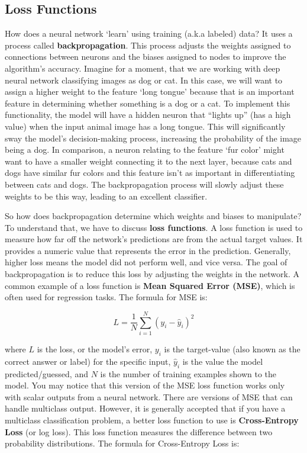 \subsection{Loss Functions}
\begin{flushleft}
    \large How does a neural network `learn' using training (a.k.a labeled) data? It uses a process called \textbf{backpropagation}. This process adjusts the weights assigned to connections between neurons and the biases assigned to nodes to improve the algorithm's accuracy. Imagine for a moment, that we are working with deep neural network classifying images as dog or cat. In this case, we will want to assign a higher weight to the feature `long tongue' because that is an important feature in determining whether something is a dog or a cat. To implement this functionality, the model will have a hidden neuron that ``lights up'' (has a high value) when the input animal image has a long tongue. This will significantly sway the model's decision-making process, increasing the probability of the image being a dog. In comparison, a neuron relating to the feature `fur color' might want to have a smaller weight connecting it to the next layer, because cats and dogs have similar fur colors and this feature isn't as important in differentiating between cats and dogs. The backpropagation process will slowly adjust these weights to be this way, leading to an excellent classifier. \break
    
    So how does backpropagation determine which weights and biases to manipulate? To understand that, we have to discuss \textbf{loss functions}. A loss function is used to measure how far off the network's predictions are from the actual target values. It provides a numeric value that represents the error in the prediction. Generally, higher loss means the model did not perform well, and vice versa. The goal of backpropagation is to reduce this loss by adjusting the weights in the network. A common example of a loss function is \textbf{Mean Squared Error (MSE)}, which is often used for regression tasks. The formula for MSE is:
    
    $$L = \frac{1}{N} \sum^{N}_{i=1} (y_i - \hat{y}_i)^2$$
    
    where $L$ is the loss, or the model's error, $y_i$ is the target-value (also known as the correct answer or label) for the specific input, $\hat{y}_i$ is the value the model predicted/guessed, and $N$ is the number of training examples shown to the model. You may notice that this version of the MSE loss function works only with scalar outputs from a neural network. There are versions of MSE that can handle multiclass output. However, it is generally accepted that if you have a multiclass classification problem, a better loss function to use is \textbf{Cross-Entropy Loss} (or log loss). This loss function measures the difference between two probability distributions. The formula for Cross-Entropy Loss is: 
    

\end{flushleft}
